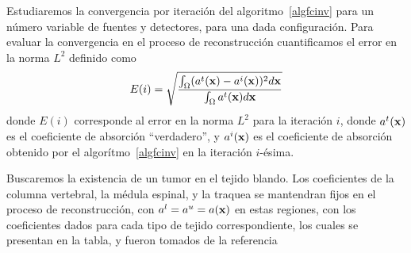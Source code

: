 Estudiaremos la convergencia por iteración del algoritmo~\ref{algfcinv} 
para un número variable de fuentes y detectores, para una dada configuración. 
Para evaluar la convergencia en el proceso de reconstrucción cuantificamos 
el error en la norma $L^2$ definido como
\begin{equation}
\begin{split}
\begin{aligned}
E(i)=\sqrt{\frac{\int_{\Omega}(a^t(\mathbf{x})-a^i(\mathbf{x}))^2  d\mathbf{x}}{\int_{\Omega}a^t(\mathbf{x}) d\mathbf{x}}}
\end{aligned}
\end{split}
\label{eq:errl2}
\end{equation}
donde $E(i)$ corresponde al error en la norma $L^2$ para la iteración $i$, 
donde $a^t(\mathbf{x})$ es el coeficiente de absorción ``verdadero'', y $a^i(\mathbf{x})$ 
es el coeficiente de absorción obtenido por el algorítmo~\ref{algfcinv} 
en la iteración $i$-ésima. 

Buscaremos la existencia de un tumor en el tejido blando. 
Los coeficientes de la columna vertebral, la médula espinal, y la traquea 
se mantendran fijos en el proceso de reconstrucción, con $a^l=a^u=a(\mathbf{x})$ 
en estas regiones, con los coeficientes dados para cada tipo de tejido correspondiente, 
los cuales se presentan en la tabla, y fueron tomados de la referencia~\cite{Fujii2016}
